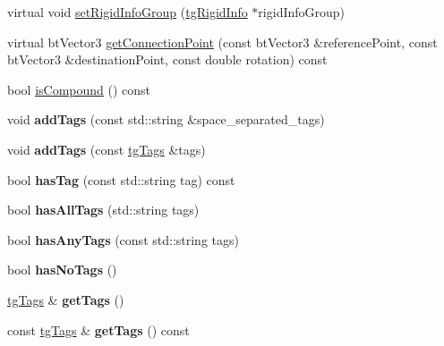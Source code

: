 \begin{DoxyCompactItemize}
\item 
virtual void \hyperlink{classtg_rigid_info_ad8a4b26de8d647ff945076dfc03e709f}{set\-Rigid\-Info\-Group} (\hyperlink{classtg_rigid_info}{tg\-Rigid\-Info} $\ast$rigid\-Info\-Group)
\item 
virtual bt\-Vector3 \hyperlink{classtg_rigid_info_ad52c51a8d052daf9b8a8c00d80f4b9f8}{get\-Connection\-Point} (const bt\-Vector3 \&reference\-Point, const bt\-Vector3 \&destination\-Point, const double rotation) const 
\item 
bool \hyperlink{classtg_rigid_info_aa20950230ff2c3346af0629e1ecd0f51}{is\-Compound} () const 
\item 
\hypertarget{classtg_taggable_af0b8f1729653b0b90d2fecbd51163612}{void {\bfseries add\-Tags} (const std\-::string \&space\-\_\-separated\-\_\-tags)}\label{classtg_taggable_af0b8f1729653b0b90d2fecbd51163612}

\item 
\hypertarget{classtg_taggable_af28e3fe1a7e4eb28772dc006d575dd1f}{void {\bfseries add\-Tags} (const \hyperlink{classtg_tags}{tg\-Tags} \&tags)}\label{classtg_taggable_af28e3fe1a7e4eb28772dc006d575dd1f}

\item 
\hypertarget{classtg_taggable_ae31f65869c8887bfeb34a344902c4d5b}{bool {\bfseries has\-Tag} (const std\-::string tag) const }\label{classtg_taggable_ae31f65869c8887bfeb34a344902c4d5b}

\item 
\hypertarget{classtg_taggable_a33b77b1075171b63f673965687b2e844}{bool {\bfseries has\-All\-Tags} (std\-::string tags)}\label{classtg_taggable_a33b77b1075171b63f673965687b2e844}

\item 
\hypertarget{classtg_taggable_af14af28fa98021c4f20a5e8f2ddd5606}{bool {\bfseries has\-Any\-Tags} (const std\-::string tags)}\label{classtg_taggable_af14af28fa98021c4f20a5e8f2ddd5606}

\item 
\hypertarget{classtg_taggable_adff345e116e16420c701a748ff8f995f}{bool {\bfseries has\-No\-Tags} ()}\label{classtg_taggable_adff345e116e16420c701a748ff8f995f}

\item 
\hypertarget{classtg_taggable_acf1d7fa9df8f374f25015c4080902681}{\hyperlink{classtg_tags}{tg\-Tags} \& {\bfseries get\-Tags} ()}\label{classtg_taggable_acf1d7fa9df8f374f25015c4080902681}

\item 
\hypertarget{classtg_taggable_ae70d7d3b45301665bc363b0ed8b9b292}{const \hyperlink{classtg_tags}{tg\-Tags} \& {\bfseries get\-Tags} () const }\label{classtg_taggable_ae70d7d3b45301665bc363b0ed8b9b292}


\end{DoxyCompactItemize}
